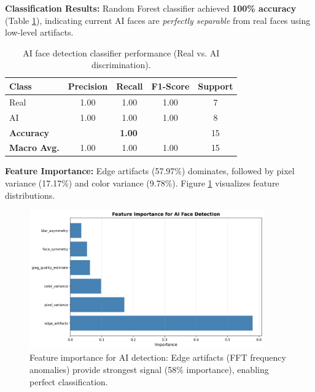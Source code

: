 \documentclass[11pt,a4paper]{article}
\begin{document}
\textbf{Classification Results:} Random Forest classifier achieved \textbf{100\% accuracy} (Table \ref{tab:ai_classifier}), indicating current AI faces are \textit{perfectly separable} from real faces using low-level artifacts.

\begin{table}[H]
\centering
\caption{AI face detection classifier performance (Real vs. AI discrimination).}
\label{tab:ai_classifier}
\begin{tabular}{@{}lcccc@{}}
\toprule
\textbf{Class} & \textbf{Precision} & \textbf{Recall} & \textbf{F1-Score} & \textbf{Support} \\ \midrule
Real & 1.00 & 1.00 & 1.00 & 7 \\
AI & 1.00 & 1.00 & 1.00 & 8 \\ \midrule
\textbf{Accuracy} & \multicolumn{3}{c}{\textbf{1.00}} & 15 \\
\textbf{Macro Avg.} & 1.00 & 1.00 & 1.00 & 15 \\ \bottomrule
\end{tabular}
\end{table}

\textbf{Feature Importance:} Edge artifacts (57.97\%) dominates, followed by pixel variance (17.17\%) and color variance (9.78\%). Figure \ref{fig:ai_importance} visualizes feature distributions.

\begin{figure}[H]
    \centering
    \includegraphics[width=0.9\textwidth]{runs/ai_detection_feature_importance.png}
    \caption{Feature importance for AI detection: Edge artifacts (FFT frequency anomalies) provide strongest signal (58\% importance), enabling perfect classification.}
    \label{fig:ai_importance}
\end{figure}
\end{document}
